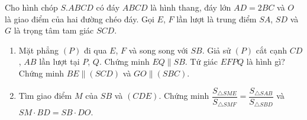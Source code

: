 \begin{ex}%
	Cho hình chóp $ S.ABCD $ có đáy $ ABCD $ là hình thang, đáy lớn $ AD=2BC $ và $ O $ là giao điểm của hai đường chéo đáy. Gọi $ E $, $ F $ lần lượt là trung điểm $ SA $, $ SD $ và $ G $ là trọng tâm tam giác $ SCD $.
	\begin{enumerate}
		\item Mặt phẳng $ (P) $ đi qua $ E $, $ F $ và song song với $ SB $. Giả sử $ (P) $ cắt cạnh $ CD $, $ AB $ lần lượt tại $ P $, $ Q $. Chứng minh $ EQ\parallel SB $. Tứ giác $ EFPQ $ là hình gì? Chứng minh $ BE\parallel (SCD) $ và $ GO\parallel (SBC) $.
		\item Tìm giao điểm $ M $ của $ SB $ và $ (CDE) $. Chứng minh $ \dfrac{S_{\triangle SME}}{S_{\triangle SMF}}=\dfrac{S_{\triangle SAB}}{S_{\triangle SBD}} $ và $ SM\cdot BD=SB\cdot DO $.
	\end{enumerate}
	\loigiai{
}
\end{ex}
